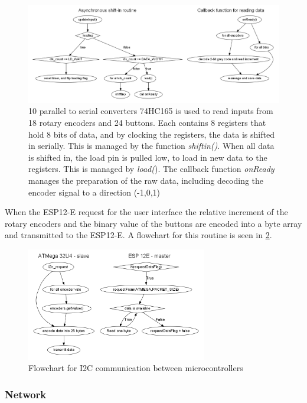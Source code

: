 \begin{figure}[H]
    \centering
    \includegraphics[width=\textwidth]{graphics/atmega_flow.png}
    \caption{10 parallel to serial converters \textsc{74HC165} is used to read inputs from 18 rotary encoders and 24 buttons. Each contains 8 registers that hold 8 bits of data, and by clocking the registers, the data is shifted in serially. This is managed by the function \textit{shiftin()}. When all data is shifted in, the load pin is pulled low, to load in new data to the registers. This is managed by \textit{load(}). The callback function \textit{onReady} manages the preparation of the raw data, including decoding the encoder signal to a direction (-1,0,1)
    }
    \label{fig:atmegaflow}
\end{figure}

When the ESP12-E request for the user interface the relative increment of the rotary encoders and the binary value of the buttons are encoded into a byte array and transmitted to the ESP12-E. A flowchart for this routine is seen in \cref{fig:i2c}.

\begin{figure}[H]
    \centering
    \includegraphics[width=0.7\textwidth]{graphics/i2c_flow.png}
    \caption{Flowchart for I2C communication between microcontrollers }
    \label{fig:i2c}
\end{figure}

\subsubsection{Network}
\label{sec:networkconf}

